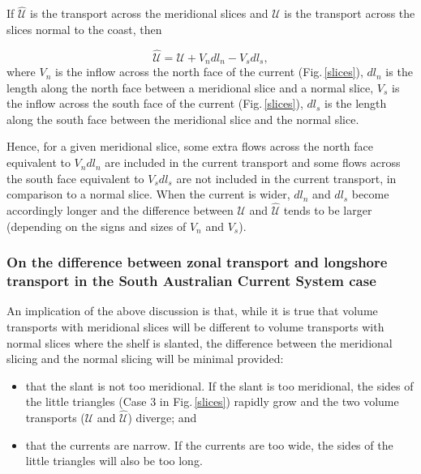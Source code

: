 \documentclass[preprint,3p,review,12pt]{elsarticle}
\begin{document}
If $\mathcal{\hat{U}}$ is the transport across the meridional slices and $\mathcal{U}$ is the transport across the slices normal to the coast, then

\begin{equation} \label{eq:20}
\mathcal{\hat{U}} = \mathcal{U} + V_{n}dl_{n} - V_{s}dl_{s},
\end{equation}
%
where $V_{n}$ is the inflow across the north face of the current (Fig.\,\ref{slices}), $dl_{n}$ is the length along the north face between a meridional slice and a normal slice, $V_{s}$ is the inflow across the south face of the current (Fig.\,\ref{slices}), $dl_{s}$ is the length along the south face between the meridional slice and the normal slice.

Hence, for a given meridional slice, some extra flows across the north face equivalent to $V_{n}dl_{n}$ are included in the current transport and some flows across the south face equivalent to $V_{s}dl_{s}$ are not included in the current transport, in comparison to a normal slice. When the current is wider, $dl_n$ and $dl_s$ become accordingly longer and the difference between $\mathcal{U}$ and $\hat{\mathcal{U}}$ tends to be larger (depending on the signs and sizes of $V_n$ and $V_s$).

\subsubsection{On the difference between zonal transport and longshore transport in the South Australian Current System case}

An implication of the above discussion is that, while it is true that volume transports with meridional slices will be different to volume transports with normal slices where the shelf is slanted, the difference between the meridional slicing and the normal slicing will be minimal provided:
%
\begin{itemize}
    \item that the slant is not too meridional. If the slant is too meridional, the sides of the little triangles (Case 3 in Fig.\,\ref{slices}) rapidly grow and the two volume transports ($\mathcal{U}$ and $\hat{\mathcal{U}}$) diverge; and
%
    \item that the currents are narrow. If the currents are too wide, the sides of the little triangles will also be too long.
\end{itemize}
\end{document}
